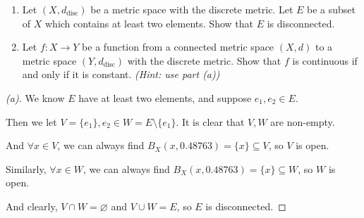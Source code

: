 \begin{problem}[15pts]
      \begin{enumerate}
  \item[(a)] Let $(X,d_{\mathrm{disc}})$ be a metric space with the discrete metric.  
Let $E$ be a subset of $X$ which contains at least two elements.  
Show that $E$ is disconnected.

\medskip
\item[(b)] 
Let $f : X \to Y$ be a function from a connected metric space $(X,d)$ to a metric space $(Y,d_{\mathrm{disc}})$ with the discrete metric.  
Show that $f$ is continuous if and only if it is constant.  
\emph{(Hint: use part (a))}
 
  \end{enumerate}
\end{problem}

\begin{proof}[(a)]
    We know $E$ have at least two elements, and suppose $e_1, e_2 \in E$.
    
    Then we let $V = \{e_1\}, e_2 \in W = E \setminus \{e_1\}$. It is clear that $V, W$ are non-empty.
    
    And $\forall x \in V$, we can always find $B_X(x, 0.48763) = \{x\} \subseteq V$, so $V$ is open.
    
    Similarly, $\forall x \in W$, we can always find $B_X(x, 0.48763) = \{x\} \subseteq W$, so $W$ is open. 
    
    And clearly, $V \cap W = \varnothing$ and $V \cup W = E$, so $E$ is disconnected.
\end{proof}


